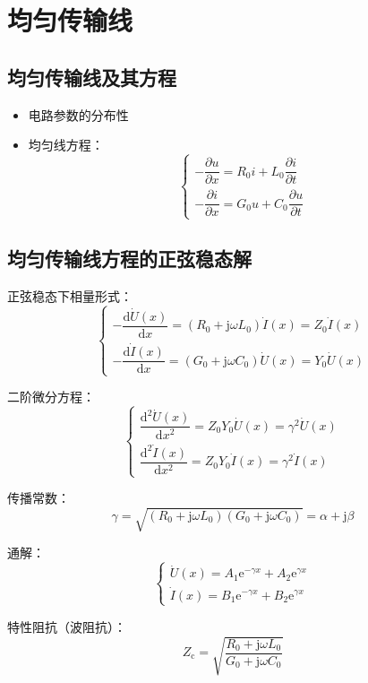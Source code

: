 \chapter{均匀传输线}

\section{均匀传输线及其方程}
\begin{itemize}
    \item 电路参数的分布性
    \item 均匀线方程：
    \[
    \begin{cases} 
    -\dfrac{\partial u}{\partial x} = R_0 i + L_0 \dfrac{\partial i}{\partial t} \\ 
    -\dfrac{\partial i}{\partial x} = G_0 u + C_0 \dfrac{\partial u}{\partial t} 
    \end{cases}
    \]
\end{itemize}

\section{均匀传输线方程的正弦稳态解}
正弦稳态下相量形式：
\[
\begin{cases} 
-\dfrac{\mathrm{d}\dot{U}(x)}{\mathrm{d}x} = \left(R_0 + \mathrm{j}\omega L_0\right)\dot{I}(x) = Z_0 \dot{I}(x) \\ 
-\dfrac{\mathrm{d}\dot{I}(x)}{\mathrm{d}x} = \left(G_0 + \mathrm{j}\omega C_0\right)\dot{U}(x) = Y_0 \dot{U}(x) 
\end{cases}
\]

二阶微分方程：
\[
\begin{cases} 
\dfrac{\mathrm{d}^2 \dot{U}(x)}{\mathrm{d}x^2} = Z_0 Y_0 \dot{U}(x) = \gamma^2 \dot{U}(x) \\ 
\dfrac{\mathrm{d}^2 \dot{I}(x)}{\mathrm{d}x^2} = Z_0 Y_0 \dot{I}(x) = \gamma^2 \dot{I}(x) 
\end{cases}
\]

传播常数：
\[
\gamma = \sqrt{\left(R_0 + \mathrm{j}\omega L_0\right)\left(G_0 + \mathrm{j}\omega C_0\right)} = \alpha + \mathrm{j}\beta
\]

通解：
\[
\begin{cases} 
\dot{U}(x) = A_1 \mathrm{e}^{-\gamma x} + A_2 \mathrm{e}^{\gamma x} \\ 
\dot{I}(x) = B_1 \mathrm{e}^{-\gamma x} + B_2 \mathrm{e}^{\gamma x} 
\end{cases}
\]

特性阻抗（波阻抗）：
\[
Z_{\mathrm{c}} = \sqrt{\frac{R_0 + \mathrm{j}\omega L_0}{G_0 + \mathrm{j}\omega C_0}}
\]

